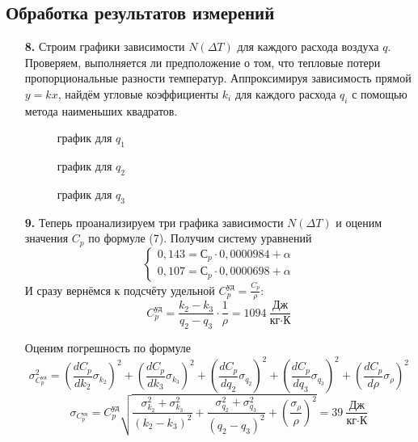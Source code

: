 \documentclass[a4paper,12pt]{article}
\begin{document}
	\subsection*{Обработка результатов измерений}
	\begin{enumerate}
		\item [\textbf{8.}] Строим графики зависимости $N(\Delta T)$ для каждого расхода воздуха $q$. Проверяем, выполняется ли предположение о том, что тепловые потери пропорциональные разности температур. Аппроксимируя зависимость прямой $y = kx$, найдём угловые коэффициенты $k_i$ для каждого расхода $q_i$ с помощью метода наименьших квадратов.
		
		\begin{center}
			\begin{figure}[]
				\caption[]{\label{fig:6} график для $q_1$}
			\end{figure}
			\begin{figure}[]
				\caption[]{\label{fig:7} график для $q_2$}
			\end{figure}
			\begin{figure}[]
				\caption[]{\label{fig:8} график для $q_3$}
			\end{figure}
		\end{center}
		\newpage
  		\newpage
    
		\item [\textbf{9.}] Теперь проанализируем три графика зависимости $N(\Delta T)$ и оценим значения $C_p$ по формуле (7). Получим систему уравнений
            \begin{equation*}
                \begin{cases}
                   0,143 = С_p \cdot 0,0000984 + \alpha\\
                   0,107 = С_p \cdot 0,0000698 + \alpha
                 \end{cases}
                \end{equation*}
            И сразу вернёмся к подсчёту удельной $C_p^{\text{уд}} = \frac{C_p}{\rho}:$
		$$C_p^{\text{уд}} = \frac{k_2 - k_3}{q_2 - q_3} \cdot \frac{1}{\rho} = 1094\ \frac{\text{Дж}}{\text{кг} \cdot\text{К}}$$

            Оценим погрешность по формуле
            \noindent
                \[\sigma_{C_p^{\text{уд}}}^2 =\left(\frac{dC_p}{dk_2}\sigma_{k_2}\right)^2 + \left(\frac{dC_p}{dk_3}\sigma_{k_3}\right)^2 + \left(\frac{dC_p}{dq_2}\sigma_{q_2}\right)^2 + \left(\frac{dC_p}{dq_3}\sigma_{q_3}\right)^2 + \left(\frac{dC_p}{d\rho}\sigma_{\rho}\right)^2 \]
                $$\sigma_{C_p^{\text{уд}}} = C_p^{\text{уд}}\sqrt{\frac{\sigma_{k_2}^2+\sigma_{k_3}^2}{(k_2 - k_3)^2} + \frac{\sigma_{q_2}^2+\sigma_{q_3}^2}{(q_2 - q_3)^2} + \left(\frac{\sigma_\rho}{\rho}\right)^2} = 39\ \frac{\text{Дж}}{\text{кг} \cdot \text{К}}$$


\end{enumerate}
\end{document}

